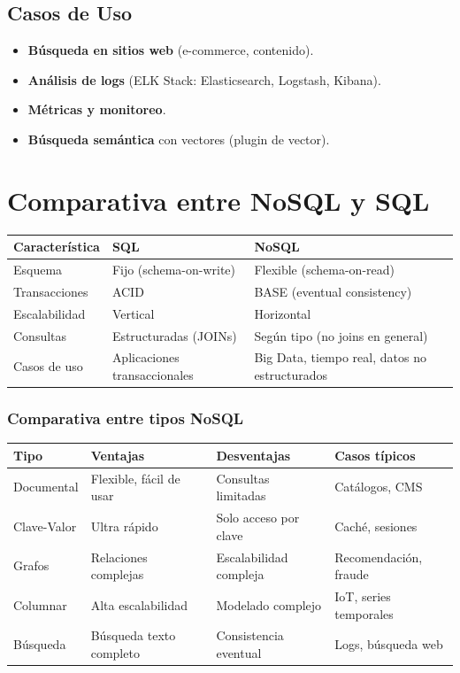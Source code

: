 \documentclass[12pt,a4paper,openany,oneside]{book}
\begin{document}
\section{Casos de Uso}
\begin{itemize}
    \item \textbf{Búsqueda en sitios web} (e-commerce, contenido).
    \item \textbf{Análisis de logs} (ELK Stack: Elasticsearch, Logstash, Kibana).
    \item \textbf{Métricas y monitoreo}.
    \item \textbf{Búsqueda semántica} con vectores (plugin de vector).
\end{itemize}

\chapter{Comparativa entre NoSQL y SQL}
\begin{center}
\begin{tabular}{|l|l|l|}
\hline
\textbf{Característica} & \textbf{SQL} & \textbf{NoSQL} \\ \hline
Esquema & Fijo (schema-on-write) & Flexible (schema-on-read) \\
Transacciones & ACID & BASE (eventual consistency) \\
Escalabilidad & Vertical & Horizontal \\
Consultas & Estructuradas (JOINs) & Según tipo (no joins en general) \\
Casos de uso & Aplicaciones transaccionales & Big Data, tiempo real, datos no estructurados \\ \hline
\end{tabular}
\end{center}

\subsection*{Comparativa entre tipos NoSQL}
\begin{center}
\begin{tabular}{|l|l|l|l|}
\hline
\textbf{Tipo} & \textbf{Ventajas} & \textbf{Desventajas} & \textbf{Casos típicos} \\ \hline
Documental & Flexible, fácil de usar & Consultas limitadas & Catálogos, CMS \\
Clave-Valor & Ultra rápido & Solo acceso por clave & Caché, sesiones \\
Grafos & Relaciones complejas & Escalabilidad compleja & Recomendación, fraude \\
Columnar & Alta escalabilidad & Modelado complejo & IoT, series temporales \\
Búsqueda & Búsqueda texto completo & Consistencia eventual & Logs, búsqueda web \\ \hline
\end{tabular}
\end{center}
\end{document}
